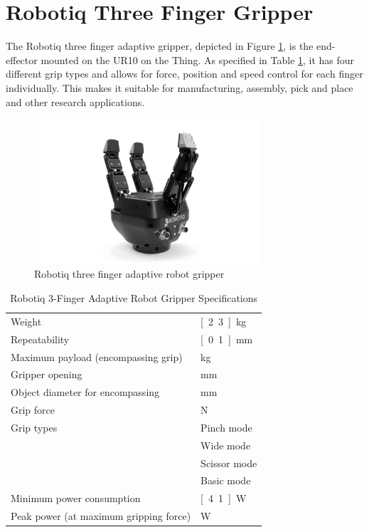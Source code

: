 \section{Robotiq Three Finger Gripper}
The Robotiq three finger adaptive gripper, depicted in Figure \ref{pics:robotiq_gripper}, is the end-effector mounted on the UR10 on the Thing. As specified in Table \ref{tab:robotiq_gripper}, it has four different grip types and allows for force, position and speed control for each finger individually. This makes it suitable for manufacturing, assembly, pick and place and other research applications.

\begin{figure}[h]
   \centering
   \includegraphics[width=0.75\textwidth]{images/robotiq_gripper.jpg}
   \caption{Robotiq three finger adaptive robot gripper}
   \label{pics:robotiq_gripper}
\end{figure}

\begin{table}[h]
\begin{center}
 \caption{Robotiq 3-Finger Adaptive Robot Gripper Specifications}\vspace{1ex}
 \label{tab:robotiq_gripper}
 \begin{tabular}{ll}
 \hline
 Weight & \unit[2.3]{kg}\\
 Repeatability & \unit[0.1]{mm} \\
 Maximum payload (encompassing grip) & \unit[10]{kg}\\
 Gripper opening & \unit[0 to 155]{mm} \\
 Object diameter for encompassing & \unit[20 to 155]{mm}\\
 Grip force & \unit[30 to 70]{N} \\
 Grip types & Pinch mode \\
 & Wide mode \\
 & Scissor mode \\
 & Basic mode \\
 Minimum power consumption & \unit[4.1]{W} \\
 Peak power (at maximum gripping force) & \unit[36]{W}\\
 \hline
 \end{tabular}
\end{center}
\end{table}


